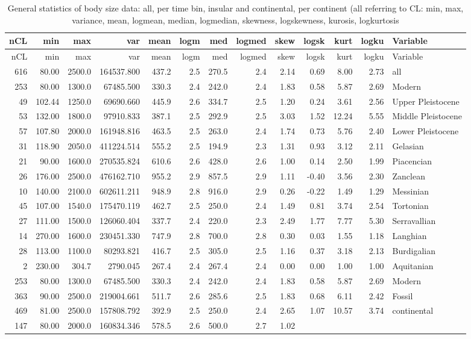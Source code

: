 \documentclass[]{article}
\begin{document}
\begin{longtable}[]{@{}rrrrrrrrrrrrl@{}}
\caption{General statistics of body size data: all, per time bin,
insular and continental, per continent (all referring to CL: min, max,
variance, mean, logmean, median, logmedian, skewness, logskewness,
kurosis, logkurtosis}\tabularnewline
\toprule
nCL & min & max & var & mean & logm & med & logmed & skew & logsk & kurt
& logku & Variable\tabularnewline
\midrule
\endfirsthead
\toprule
nCL & min & max & var & mean & logm & med & logmed & skew & logsk & kurt
& logku & Variable\tabularnewline
\midrule
\endhead
616 & 80.00 & 2500.0 & 164537.800 & 437.2 & 2.5 & 270.5 & 2.4 & 2.14 &
0.69 & 8.00 & 2.73 & all\tabularnewline
253 & 80.00 & 1300.0 & 67485.500 & 330.3 & 2.4 & 242.0 & 2.4 & 1.83 &
0.58 & 5.87 & 2.69 & Modern\tabularnewline
49 & 102.44 & 1250.0 & 69690.660 & 445.9 & 2.6 & 334.7 & 2.5 & 1.20 &
0.24 & 3.61 & 2.56 & Upper Pleistocene\tabularnewline
53 & 132.00 & 1800.0 & 97910.833 & 387.1 & 2.5 & 292.9 & 2.5 & 3.03 &
1.52 & 12.24 & 5.55 & Middle Pleistocene\tabularnewline
57 & 107.80 & 2000.0 & 161948.816 & 463.5 & 2.5 & 263.0 & 2.4 & 1.74 &
0.73 & 5.76 & 2.40 & Lower Pleistocene\tabularnewline
31 & 118.90 & 2050.0 & 411224.514 & 555.2 & 2.5 & 194.9 & 2.3 & 1.31 &
0.93 & 3.12 & 2.11 & Gelasian\tabularnewline
21 & 90.00 & 1600.0 & 270535.824 & 610.6 & 2.6 & 428.0 & 2.6 & 1.00 &
0.14 & 2.50 & 1.99 & Piacencian\tabularnewline
26 & 176.00 & 2500.0 & 476162.710 & 955.2 & 2.9 & 857.5 & 2.9 & 1.11 &
-0.40 & 3.56 & 2.30 & Zanclean\tabularnewline
10 & 140.00 & 2100.0 & 602611.211 & 948.9 & 2.8 & 916.0 & 2.9 & 0.26 &
-0.22 & 1.49 & 1.29 & Messinian\tabularnewline
45 & 107.00 & 1540.0 & 175470.119 & 462.7 & 2.5 & 250.0 & 2.4 & 1.49 &
0.81 & 3.74 & 2.54 & Tortonian\tabularnewline
27 & 111.00 & 1500.0 & 126060.404 & 337.7 & 2.4 & 220.0 & 2.3 & 2.49 &
1.77 & 7.77 & 5.30 & Serravallian\tabularnewline
14 & 270.00 & 1600.0 & 230451.330 & 747.9 & 2.8 & 700.0 & 2.8 & 0.30 &
0.03 & 1.55 & 1.18 & Langhian\tabularnewline
28 & 113.00 & 1100.0 & 80293.821 & 416.7 & 2.5 & 305.0 & 2.5 & 1.16 &
0.37 & 3.18 & 2.13 & Burdigalian\tabularnewline
2 & 230.00 & 304.7 & 2790.045 & 267.4 & 2.4 & 267.4 & 2.4 & 0.00 & 0.00
& 1.00 & 1.00 & Aquitanian\tabularnewline
253 & 80.00 & 1300.0 & 67485.500 & 330.3 & 2.4 & 242.0 & 2.4 & 1.83 &
0.58 & 5.87 & 2.69 & Modern\tabularnewline
363 & 90.00 & 2500.0 & 219004.661 & 511.7 & 2.6 & 285.6 & 2.5 & 1.83 &
0.68 & 6.11 & 2.42 & Fossil\tabularnewline
469 & 81.00 & 2500.0 & 157808.792 & 392.9 & 2.5 & 250.0 & 2.4 & 2.65 &
1.07 & 10.57 & 3.74 & continental\tabularnewline
147 & 80.00 & 2000.0 & 160834.346 & 578.5 & 2.6 & 500.0 & 2.7 & 1.02 &

\end{longtable}
\end{document}
